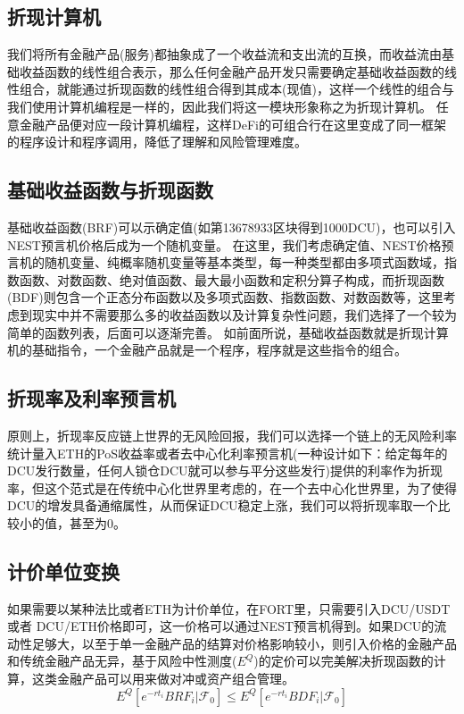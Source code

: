 \documentclass[letterpaper,11pt]{ctexart}
\begin{document}
\subsection{折现计算机}

我们将所有金融产品(服务)都抽象成了一个收益流和支出流的互换，而收益流由基础收益函数的线性组合表示，那么任何金融产品开发只需要确定基础收益函数的线性组合，就能通过折现函数的线性组合得到其成本(现值)，这样一个线性的组合与我们使用计算机编程是一样的，因此我们将这一模块形象称之为折现计算机。
任意金融产品便对应一段计算机编程，这样DeFi的可组合行在这里变成了同一框架的程序设计和程序调用，降低了理解和风险管理难度。

\subsection{基础收益函数与折现函数}

基础收益函数(BRF)可以示确定值(如第13678933区块得到1000DCU)，也可以引入NEST预言机价格后成为一个随机变量。
在这里，我们考虑确定值、NEST价格预言机的随机变量、纯概率随机变量等基本类型，每一种类型都由多项式函数域，指数函数、对数函数、绝对值函数、最大最小函数和定积分算子构成，而折现函数(BDF)则包含一个正态分布函数以及多项式函数、指数函数、对数函数等，这里考虑到现实中并不需要那么多的收益函数以及计算复杂性问题，我们选择了一个较为简单的函数列表，后面可以逐渐完善。
如前面所说，基础收益函数就是折现计算机的基础指令，一个金融产品就是一个程序，程序就是这些指令的组合。


\subsection{折现率及利率预言机}
原则上，折现率反应链上世界的无风险回报，我们可以选择一个链上的无风险利率统计量入ETH的PoS收益率或者去中心化利率预言机(一种设计如下：给定每年的DCU发行数量，任何人锁仓DCU就可以参与平分这些发行)提供的利率作为折现率，但这个范式是在传统中心化世界里考虑的，在一个去中心化世界里，为了使得DCU的增发具备通缩属性，从而保证DCU稳定上涨，我们可以将折现率取一个比较小的值，甚至为0。

\subsection{计价单位变换}
如果需要以某种法比或者ETH为计价单位，在FORT里，只需要引入DCU/USDT或者 DCU/ETH价格即可，这一价格可以通过NEST预言机得到。如果DCU的流动性足够大，以至于单一金融产品的结算对价格影响较小，则引入价格的金融产品和传统金融产品无异，基于风险中性测度($E^Q$)的定价可以完美解决折现函数的计算，这类金融产品可以用来做对冲或资产组合管理。
\begin{equation}
E^Q\left[e^{-rt_{i}}BRF_{i}|\mathcal{F}_0\right] \leq E^Q\left[e^{-rt_{i}}BDF_{i}|\mathcal{F}_0\right] 
\end{equation}
\end{document}
